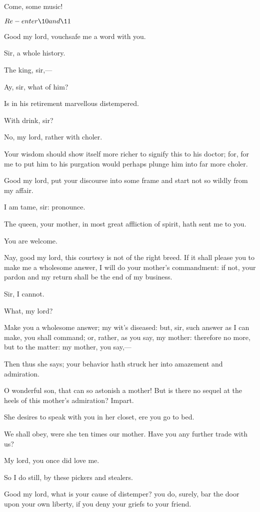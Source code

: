 \documentclass[11pt]{book}
\begin{document}
	Come, some music!

	\(Re-enter \10 and \11\)

	Good my lord, vouchsafe me a word with you.

\1	Sir, a whole history.

	The king, sir,---

\1	Ay, sir, what of him?

	Is in his retirement marvellous distempered.

\1	With drink, sir?

	No, my lord, rather with choler.

\1	Your wisdom should show itself more richer to
	signify this to his doctor; for, for me to put him
	to his purgation would perhaps plunge him into far
	more choler.

	Good my lord, put your discourse into some frame and
	start not so wildly from my affair.

\1	I am tame, sir: pronounce.

	The queen, your mother, in most great affliction of
	spirit, hath sent me to you.

\1	You are welcome.

	Nay, good my lord, this courtesy is not of the right
	breed. If it shall please you to make me a
	wholesome answer, I will do your mother's
	commandment: if not, your pardon and my return
	shall be the end of my business.

\1	Sir, I cannot.

	What, my lord?

\1	Make you a wholesome answer; my wit's diseased: but,
	sir, such answer as I can make, you shall command;
	or, rather, as you say, my mother: therefore no
	more, but to the matter: my mother, you say,---

	Then thus she says; your behavior hath struck her
	into amazement and admiration.

\1	O wonderful son, that can so astonish a mother! But
	is there no sequel at the heels of this mother's
	admiration? Impart.

	She desires to speak with you in her closet, ere you
	go to bed.

\1	We shall obey, were she ten times our mother. Have
	you any further trade with us?

	My lord, you once did love me.

\1	So I do still, by these pickers and stealers.

	Good my lord, what is your cause of distemper? you
	do, surely, bar the door upon your own liberty, if
	you deny your griefs to your friend.
\end{document}
